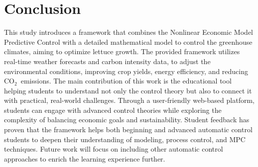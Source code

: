 \documentclass[conference]{IEEEtran}
\newcommand{\coo}{\ensuremath{\mathrm{CO_2}}}
\begin{document}
\section{Conclusion}
This study introduces a framework that combines the Nonlinear Economic Model Predictive Control with a detailed mathematical model to control the greenhouse climates, aiming to optimize lettuce growth. The provided framework utilizes real-time weather forecasts and carbon intensity data, to adjust the environmental conditions, improving crop yields, energy efficiency, and reducing \coo\ emissions.
%
The main contribution of this work is the educational tool helping students to understand not only the control theory but also to connect it with practical, real-world challenges. Through a user-friendly web-based platform, students can engage with advanced control theories while exploring the complexity of balancing economic goals and sustainability.
%
Student feedback has proven that the framework helps both beginning and advanced automatic control students to deepen their understanding of modeling, process control, and MPC techniques. Future work will focus on including other automatic control approaches to enrich the learning experience further.



\end{document}
